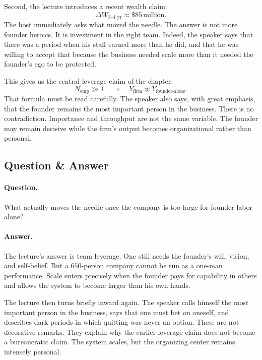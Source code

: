 Second, the lecture introduces a recent wealth claim:
\begin{equation}
\Delta W_{3\text{--}4\text{ yr}} \approx \$85\,\text{million}.
\end{equation}
The host immediately asks what moved the needle. The answer is not more founder heroics. It is investment in the right team. Indeed, the speaker says that there was a period when his staff earned more than he did, and that he was willing to accept that because the business needed scale more than it needed the founder’s ego to be protected.

This gives us the central leverage claim of the chapter:
\begin{equation}
N_{\text{emp}} \gg 1 \quad \Rightarrow \quad Y_{\text{firm}} \not\approx Y_{\text{founder-alone}}.
\end{equation}
That formula must be read carefully. The speaker also says, with great emphasis, that the founder remains the most important person in the business. There is no contradiction. Importance and throughput are not the same variable. The founder may remain decisive while the firm’s output becomes organizational rather than personal.

\subsection{Question \& Answer}

\paragraph{Question.} What actually moves the needle once the company is too large for founder labor alone?

\paragraph{Answer.} The lecture’s answer is team leverage. One still needs the founder’s will, vision, and self-belief. But a \(650\)-person company cannot be run as a one-man performance. Scale enters precisely when the founder pays for capability in others and allows the system to become larger than his own hands.

The lecture then turns briefly inward again. The speaker calls himself the most important person in the business, says that one must bet on oneself, and describes dark periods in which quitting was never an option. These are not decorative remarks. They explain why the earlier leverage claim does not become a bureaucratic claim. The system scales, but the organizing center remains intensely personal.

